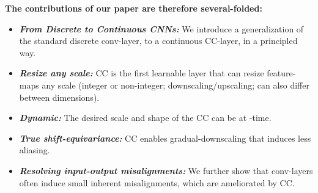 \textbf{The contributions of our paper are therefore several-folded:}
\vspace*{-0.3cm}
\begin{itemize}[noitemsep,leftmargin=0.7cm]
    \item \emph{\textbf{From Discrete to Continuous CNNs:}} We introduce a generalization of the standard discrete conv-layer, to a continuous CC-layer, 
    in a principled way.
    \item \emph{\textbf{Resize  any scale:}} CC is the first learnable layer that can resize feature-maps  any scale (integer or non-integer; downscaling/upscaling; can also differ between dimensions).
    \item  \emph{\textbf{Dynamic:}} 
    The desired scale and shape of the CC  can be  at -time.
        \item \emph{\textbf{True shift-equivariance:}}  CC enables gradual-downscaling that induces less aliasing.
    \item \emph{\textbf{Resolving input-output misalignments:}} 
    We further show that conv-layers often induce small inherent misalignments, 
    which are ameliorated by CC.
\vspace*{-0.3cm}
\end{itemize}


